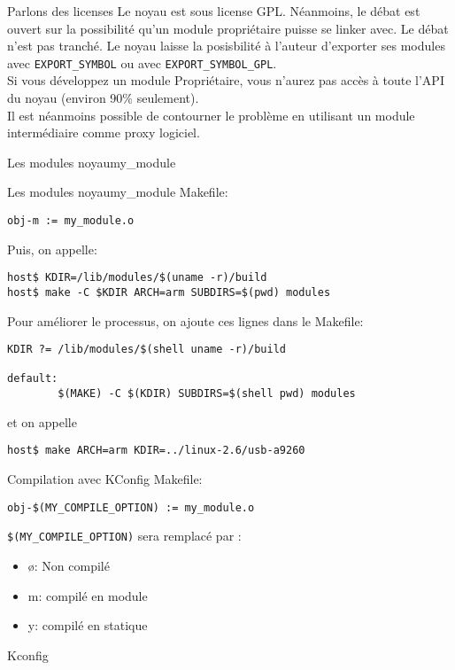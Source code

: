 \begin{frame}[fragile=singleslide]{Parlons des licenses}
  Le noyau est sous license GPL. Néanmoins, le débat est ouvert sur la
  possibilité  qu'un module  propriétaire puisse  se linker  avec.  Le
  débat n'est pas  tranché. Le noyau laisse la  posisbilité à l'auteur
  d'exporter   ses   modules   avec   \verb+EXPORT_SYMBOL+   ou   avec
  \verb+EXPORT_SYMBOL_GPL+.
\\[2ex]
  Si vous développez un module Propriétaire, vous n'aurez pas accès à
  toute l'API du noyau (environ 90\% seulement).
\\[2ex]
  Il est néanmoins possible de contourner le problème en utilisant un
  module intermédiaire comme proxy logiciel.
\end{frame}

\begin{frame}[fragile=singleslide]{Les modules noyau}{my\_module}
  
\end{frame}

\begin{frame}[fragile=singleslide]{Les modules noyau}{my\_module}
  Makefile:
  \begin{lstlisting}
obj-m := my_module.o  
  \end{lstlisting}
  Puis, on appelle:
  \begin{lstlisting}
host$ KDIR=/lib/modules/$(uname -r)/build
host$ make -C $KDIR ARCH=arm SUBDIRS=$(pwd) modules
  \end{lstlisting} %
  Pour améliorer le processus, on ajoute ces lignes dans le Makefile:
  \begin{lstlisting}
KDIR ?= /lib/modules/$(shell uname -r)/build

default:
        $(MAKE) -C $(KDIR) SUBDIRS=$(shell pwd) modules
  \end{lstlisting}
  et on appelle
  \begin{lstlisting}
host$ make ARCH=arm KDIR=../linux-2.6/usb-a9260 
  \end{lstlisting} %
\end{frame}

\begin{frame}[fragile=singleslide]{Compilation avec KConfig}
  Makefile:
  \begin{lstlisting}
obj-$(MY_COMPILE_OPTION) := my_module.o  
  \end{lstlisting} %
  \verb+$(MY_COMPILE_OPTION)+ sera remplacé par :
  \begin{itemize}
  \item ø: Non compilé
  \item m: compilé en module
  \item y: compilé en statique
  \end{itemize}
  Kconfig
  
\end{frame}

